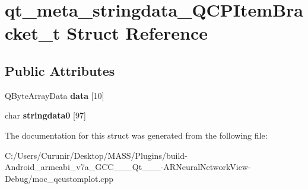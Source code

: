 \hypertarget{structqt__meta__stringdata___q_c_p_item_bracket__t}{}\section{qt\+\_\+meta\+\_\+stringdata\+\_\+\+Q\+C\+P\+Item\+Bracket\+\_\+t Struct Reference}
\label{structqt__meta__stringdata___q_c_p_item_bracket__t}
\subsection*{Public Attributes}
\begin{DoxyCompactItemize}
\item 
\mbox{\label{structqt__meta__stringdata___q_c_p_item_bracket__t_ab8a3cd97c81976ae3c4cfca1182b2198}} 
Q\+Byte\+Array\+Data {\bfseries data} \mbox{[}10\mbox{]}
\item 
\mbox{\label{structqt__meta__stringdata___q_c_p_item_bracket__t_ae980379b3748de6ed1890ad0560f62ab}} 
char {\bfseries stringdata0} \mbox{[}97\mbox{]}
\end{DoxyCompactItemize}


The documentation for this struct was generated from the following file\+:\begin{DoxyCompactItemize}
\item 
C\+:/\+Users/\+Curunir/\+Desktop/\+M\+A\+S\+S/\+Plugins/build-\/\+Android\+\_\+armeabi\+\_\+v7a\+\_\+\+G\+C\+C\+\_\+\_\+\_\+\+Qt\+\_\+\_\+\_-\/\+A\+R\+Neural\+Network\+View-\/\+Debug/moc\+\_\+qcustomplot.\+cpp\end{DoxyCompactItemize}
